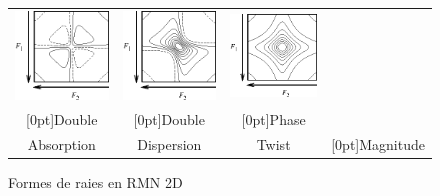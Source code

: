 \documentclass[11pt,a4paper]{article}
\newcommand{\myc}[1]{\multicolumn{1}{c}{#1}}
\begin{document}
\begin{figure}
\begin{center}
\begin{tabular}{llll}
\includegraphics[scale=0.9]{cont2.eps} & 
\includegraphics[scale=0.9]{cont3.eps} & 
\includegraphics[scale=0.9]{cont4.eps} \\
\myc{\raisebox{-0.5ex}[0pt]{Double}} &
\myc{\raisebox{-0.5ex}[0pt]{Double}} &
\myc{\raisebox{-0.5ex}[0pt]{Phase}} \\
\myc{Absorption} & 
\myc{Dispersion} & 
\myc{Twist} & 
\myc{\raisebox{1.25ex}[0pt]{Magnitude}}

\end{tabular}
\caption{Formes de raies en RMN 2D}
\end{center}
\end{figure}
\end{document}
